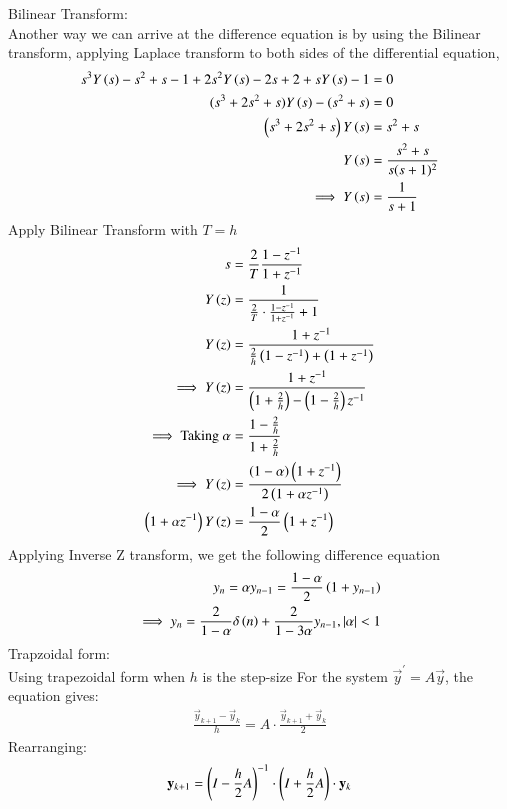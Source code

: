 \documentclass[journal]{IEEEtran}
\begin{document}
Bilinear Transform:\\
Another way we can arrive at the difference equation is by using the Bilinear transform, applying Laplace transform to both sides of the differential equation,
\begin{align}
    s^3 Y\left(s\right) - s^2 + s - 1 + 2s^2 Y\left(s\right) - 2s + 2 + s Y\left(s\right) - 1 &= 0\\
    (s^3 + 2s^2 + s) Y\left(s\right) - (s^2 + s) &= 0\\
    \left(s^3 + 2s^2 + s\right) Y\left(s\right) &= s^2 + s \\
Y\left(s\right) &= \frac{s^2 + s}{s(s+1)^2}\\
\implies Y\left(s\right) &= \frac{1}{s + 1}
\end{align}
Apply Bilinear Transform with $T=h$
\begin{align}
    s&=\frac{2}{T}\frac{1-z^{-1}}{1+z^{-1}}\\
    Y\left(z\right)&=\frac{1}{\frac{2}{T}\cdot\frac{1-z^{-1}}{1+z^{-1}}+1}\\
    Y\left(z\right)&=\frac{1+z^{-1}}{\frac{2}{h}\left(1-z^{-1}\right)+\left(1+z^{-1}\right)}\\
    \implies Y\left(z\right)&=\frac{1+z^{-1}}{\left(1+\frac{2}{h}\right)-\left(1-\frac{2}{h}\right)z^{-1}}\\
    \implies \text{Taking }\alpha&=\frac{1-\frac{2}{h}}{1+\frac{2}{h}}\\
    \implies Y\left(z\right)&=\frac{\left(1-\alpha\right)\left(1+z^{-1}\right)}{2\left(1+\alpha z^{-1}\right)}\\
    \left(1+\alpha z^{-1}\right)Y\left(z\right)&=\frac{1-\alpha}{2}\left(1+z^{-1}\right)\\
\end{align}
Applying Inverse Z transform, we get the following difference equation
\begin{align}
    y_n=\alpha y_{n-1}=\frac{1-\alpha}{2}\left(1+y_{n-1}\right)\\
    \implies y_n=\frac{2}{1-\alpha}\delta\left(n\right)+\frac{2}{1-3\alpha}y_{n-1},\left\vert\alpha\right\vert<1
\end{align}
Trapzoidal form:\\
Using trapezoidal form when $h$ is the step-size For the system $\vec{y}^\prime=A\vec{y}$, the equation gives:
\begin{align}
    \frac{\vec{y}_{k+1}-\vec{y}_k}{h}=A\cdot\frac{\vec{y}_{k+1}+\vec{y}_{k}}{2}
\end{align}
Rearranging:
\begin{align}
    \mathbf{y}_{k+1}=\left(I-\frac{h}{2}A\right)^{-1}\cdot\left(I+\frac{h}{2}A\right)\cdot\mathbf{y}_k
\end{align}
\end{document}
